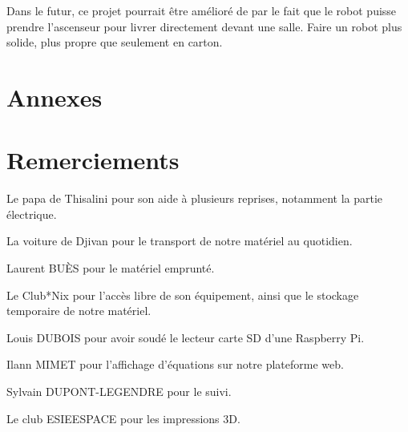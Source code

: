 \documentclass[a4paper,12pt]{report}  %
\begin{document}
Dans le futur, ce projet pourrait être amélioré de par le fait que le robot puisse prendre l’ascenseur pour livrer directement devant une salle. Faire un robot plus solide, plus propre que seulement en carton.


\section{Annexes}

\section{Remerciements}
Le papa de Thisalini pour son aide à plusieurs reprises, notamment la partie électrique.

La voiture de Djivan pour le transport de notre matériel au quotidien. 

Laurent BUÈS pour le matériel emprunté. 

Le Club*Nix pour l’accès libre de son équipement, ainsi que le stockage temporaire de notre matériel. 

Louis DUBOIS pour avoir soudé le lecteur carte SD d’une Raspberry Pi. 

Ilann MIMET pour l’affichage d’équations sur notre plateforme web. 

Sylvain DUPONT-LEGENDRE pour le suivi. 

Le club ESIEESPACE pour les impressions 3D.
\end{document}
